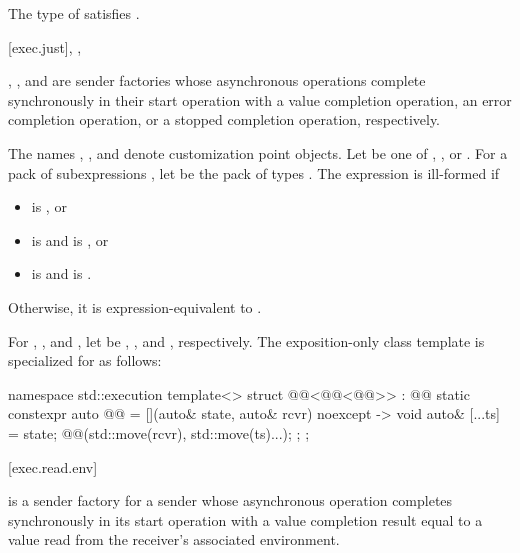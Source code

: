 \pnum
\mandates
The type of  satisfies .

[exec.just]{, , }

\pnum
{}, , and  are sender factories
whose asynchronous operations complete synchronously in their start operation
with a value completion operation,
an error completion operation, or
a stopped completion operation, respectively.

\pnum
The names , , and  denote
customization point objects.
Let  be one of
, , or .
For a pack of subexpressions ,
let  be the pack of types .
The expression  is ill-formed if
\begin{itemize}
\item
{} is , or
\item
{} is  and
 is , or
\item
{} is  and
 is .
\end{itemize}

Otherwise, it is expression-equivalent to
.

For , , and ,
let  be
, , and , respectively.
The exposition-only class template 
is specialized for  as follows:
\begin{codeblock}
namespace std::execution {
  template<>
  struct @@<@@<@@>> : @@ {
    static constexpr auto @@ =
      [](auto& state, auto& rcvr) noexcept -> void {
        auto& [...ts] = state;
        @@(std::move(rcvr), std::move(ts)...);
      };
  };
}
\end{codeblock}

[exec.read.env]{}

\pnum
{} is a sender factory for a sender
whose asynchronous operation completes synchronously in its start operation
with a value completion result equal to
a value read from the receiver's associated environment.

